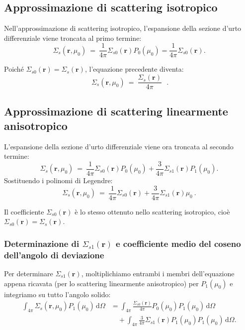 \subsection{Approssimazione di scattering isotropico}

Nell'approssimazione di scattering isotropico, l’espansione della sezione d’urto differenziale viene troncata al primo termine:
\begin{equation}
	\Sigma_s (\mathbf{r}, \mu_0)\ =\ \frac{1}{4\pi} \Sigma_{s0} (\mathbf{r}) P_0 (\mu_0) = \frac{1}{4\pi} \Sigma_{s0} (\mathbf{r}).
\end{equation}

Poiché $\Sigma_{s0}(\mathbf{r}) = \Sigma_s(\mathbf{r})$, l’equazione precedente diventa:
\begin{equation}
	\boxed{\ \Sigma_s (\mathbf{r}, \mu_0)\ =\ \frac{\Sigma_s (\mathbf{r})}{4\pi}\ }\ \ .
\end{equation}


\subsection{Approssimazione di scattering linearmente anisotropico}
L'espansione della sezione d'urto differenziale viene ora troncata al secondo termine:
\begin{equation}
	\Sigma_s(\mathbf{r}, \mu_0)\ =\ \frac{1}{4\pi} \Sigma_{s0}(\mathbf{r}) P_0(\mu_0) + \frac{3}{4\pi} \Sigma_{s1}(\mathbf{r}) P_1(\mu_0).
\end{equation}
Sostituendo i polinomi di Legendre:
\begin{equation}
	\Sigma_s(\mathbf{r}, \mu_0)\ =\ \frac{1}{4\pi} \Sigma_{s0}(\mathbf{r}) + \frac{3}{4\pi} \Sigma_{s1}(\mathbf{r}) \mu_0\  .
\end{equation}

Il coefficiente $\Sigma_{s0}(\mathbf{r})$ è lo stesso ottenuto nello scattering isotropico, cioè $\Sigma_{s0}(\mathbf{r}) = \Sigma_s(\mathbf{r})$.


\subsubsection{Determinazione di $\Sigma_{s1}(\mathbf{r})$ e coefficiente medio del coseno dell’angolo di deviazione}
Per determinare $\Sigma_{s1}(\mathbf{r})$, moltiplichiamo entrambi i membri dell’equazione appena ricavata (per lo scattering linearmente anisotropico) per $P_1(\mu_0)$ e integriamo su tutto l’angolo solido:
\begin{equation}
	\begin{aligned}
		\int_{4\pi} \Sigma_s(\mathbf{r}, \mu_0) P_1(\mu_0) \, \mathrm{d}\Omega &= \int_{4\pi} \frac{\Sigma_{s0}(\mathbf{r})}{4\pi} P_0(\mu_0) P_1(\mu_0) \, \mathrm{d}\Omega \\
		&\quad + \int_{4\pi} \frac{3}{4\pi} \Sigma_{s1}(\mathbf{r}) P_1(\mu_0) P_1(\mu_0) \, \mathrm{d}\Omega.
	\end{aligned}
\end{equation}

